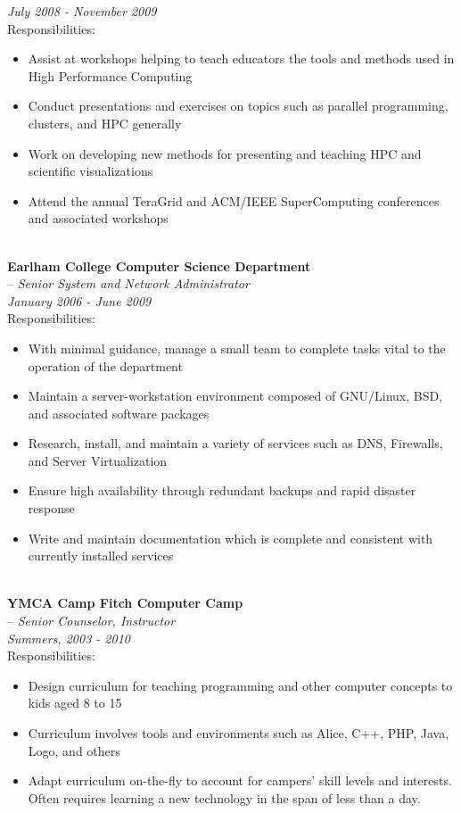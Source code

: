 \documentclass[10pt]{article}
\begin{document}
\indent\textit{July 2008 - November 2009}~\\
\indent Responsibilities:
\begin{itemize}
  \addtolength{\itemsep}{-2mm}
    \item \indent Assist at workshops helping to teach educators the tools and methods used in High Performance Computing
    \item \indent Conduct presentations and exercises on topics such as parallel programming, clusters, and HPC generally
    \item \indent Work on developing new methods for presenting and teaching HPC and scientific visualizations
    \item \indent Attend the annual TeraGrid and ACM/IEEE SuperComputing conferences and associated workshops
\end{itemize}
~\\
\indent\textbf{Earlham College Computer Science Department}~\\
\indent \indent -- \emph{Senior System and Network Administrator}~\\
\indent\textit{January 2006 - June 2009}~\\
\indent Responsibilities:
  \begin{itemize}
  \addtolength{\itemsep}{-2mm}
    \item \indent With minimal guidance, manage a small team to complete tasks vital to the operation of the department
    \item \indent Maintain a server-workstation environment composed of GNU/Linux, BSD, and associated software packages
    \item \indent Research, install, and maintain a variety of services such as DNS, Firewalls, and Server Virtualization
    \item \indent Ensure high availability through redundant backups and rapid disaster response
    \item \indent Write and maintain documentation which is complete and consistent with currently installed services
  \end{itemize}
~\\
\indent\textbf{YMCA Camp Fitch Computer Camp}~\\
\indent \indent -- \emph{Senior Counselor, Instructor}~\\
\indent\textit{Summers, 2003 - 2010}~\\
\indent Responsibilities:
  \begin{itemize}
  \addtolength{\itemsep}{-2mm}
    \item \indent Design curriculum for teaching programming and other computer concepts to kids aged 8 to 15
    \item \indent Curriculum involves tools and environments such as Alice, C++, PHP, Java, Logo, and others
    \item \indent Adapt curriculum on-the-fly to account for campers' skill levels and interests. Often requires learning a new technology in the span of less than a day.
  \end{itemize}
\end{document}
